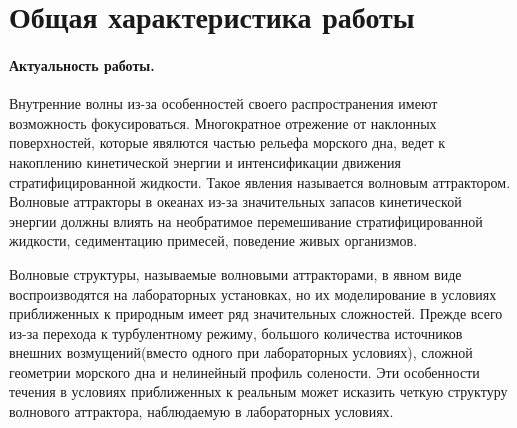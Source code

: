 \documentclass[utf8x]{G7-32} %
\begin{document}
\setcounter{page}{3}
\pagestyle{fancy}
\setcounter{secnumdepth}{-1}

\section{Общая характеристика работы}


\paragraph{Актуальность работы.}

Внутренние волны из-за особенностей своего распространения имеют возможность фокусироваться. Многократное отрежение от наклонных поверхностей, которые явялются частью рельефа морского дна, ведет к накоплению кинетической энергии и интенсификации движения стратифицированной жидкости. Такое явления называется волновым аттрактором. Волновые аттракторы в океанах из-за значительных запасов кинетической энергии должны влиять на необратимое перемешивание стратифицированной жидкости, седиментацию примесей, поведение живых организмов. 

Волновые структуры, называемые волновыми аттракторами, в явном виде воспроизводятся на лабораторных установках, но их моделирование в условиях приближенных к природным имеет ряд значительных сложностей. Прежде всего из-за перехода к турбулентному режиму, большого количества источников внешних возмущений(вместо одного при лабораторных условиях), сложной геометрии морского дна и нелинейный профиль солености. Эти особенности течения в условиях приближенных к реальным может исказить четкую структуру волнового аттрактора, наблюдаемую в лабораторных условиях. 
\end{document}
